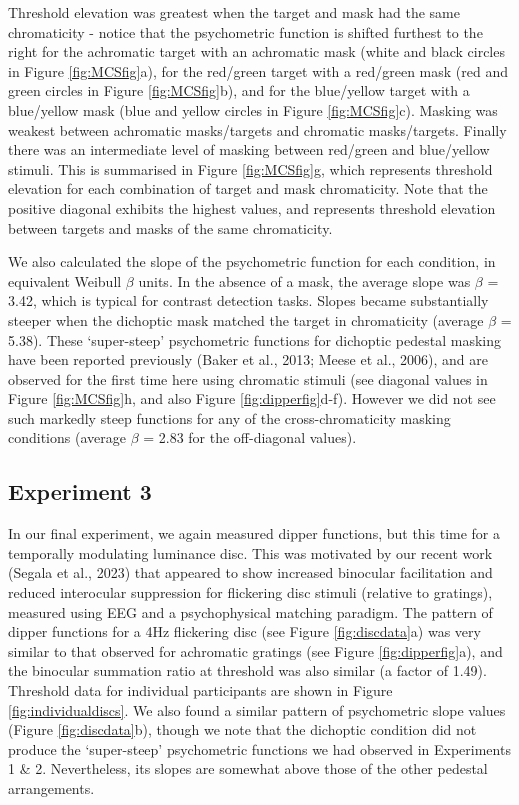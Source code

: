 \documentclass[
]{article}
\begin{document}
Threshold elevation was greatest when the target and mask had the same chromaticity - notice that the psychometric function is shifted furthest to the right for the achromatic target with an achromatic mask (white and black circles in Figure \ref{fig:MCSfig}a), for the red/green target with a red/green mask (red and green circles in Figure \ref{fig:MCSfig}b), and for the blue/yellow target with a blue/yellow mask (blue and yellow circles in Figure \ref{fig:MCSfig}c). Masking was weakest between achromatic masks/targets and chromatic masks/targets. Finally there was an intermediate level of masking between red/green and blue/yellow stimuli. This is summarised in Figure \ref{fig:MCSfig}g, which represents threshold elevation for each combination of target and mask chromaticity. Note that the positive diagonal exhibits the highest values, and represents threshold elevation between targets and masks of the same chromaticity.

We also calculated the slope of the psychometric function for each condition, in equivalent Weibull \(\beta\) units. In the absence of a mask, the average slope was \(\beta\) = 3.42, which is typical for contrast detection tasks. Slopes became substantially steeper when the dichoptic mask matched the target in chromaticity (average \(\beta\) = 5.38). These `super-steep' psychometric functions for dichoptic pedestal masking have been reported previously (Baker et al., 2013; Meese et al., 2006), and are observed for the first time here using chromatic stimuli (see diagonal values in Figure \ref{fig:MCSfig}h, and also Figure \ref{fig:dipperfig}d-f). However we did not see such markedly steep functions for any of the cross-chromaticity masking conditions (average \(\beta\) = 2.83 for the off-diagonal values).

\hypertarget{experiment-3}{%
\subsection{Experiment 3}\label{experiment-3}}

In our final experiment, we again measured dipper functions, but this time for a temporally modulating luminance disc. This was motivated by our recent work (Segala et al., 2023) that appeared to show increased binocular facilitation and reduced interocular suppression for flickering disc stimuli (relative to gratings), measured using EEG and a psychophysical matching paradigm. The pattern of dipper functions for a 4Hz flickering disc (see Figure \ref{fig:discdata}a) was very similar to that observed for achromatic gratings (see Figure \ref{fig:dipperfig}a), and the binocular summation ratio at threshold was also similar (a factor of 1.49). Threshold data for individual participants are shown in Figure \ref{fig:individualdiscs}. We also found a similar pattern of psychometric slope values (Figure \ref{fig:discdata}b), though we note that the dichoptic condition did not produce the `super-steep' psychometric functions we had observed in Experiments 1 \& 2. Nevertheless, its slopes are somewhat above those of the other pedestal arrangements.
\end{document}

